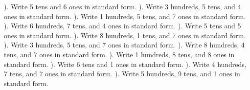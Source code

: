 \documentclass{article}%
\begin{document}
\newline%
\newline%
). Write 5 tens and 6 ones in standard form.%
\newline%
\newline%
). Write 3 hundreds, 5 tens, and 4 ones in standard form.%
\newline%
\newline%
). Write 1 hundreds, 5 tens, and 7 ones in standard form.%
\newline%
\newline%
). Write 6 hundreds, 7 tens, and 4 ones in standard form.%
\newline%
\newline%
). Write 5 tens and 5 ones in standard form.%
\newline%
\newline%
). Write 8 hundreds, 1 tens, and 7 ones in standard form.%
\newline%
\newline%
). Write 3 hundreds, 5 tens, and 7 ones in standard form.%
\newline%
\newline%
). Write 8 hundreds, 4 tens, and 7 ones in standard form.%
\newline%
\newline%
). Write 1 hundreds, 8 tens, and 8 ones in standard form.%
\newline%
\newline%
). Write 6 tens and 1 ones in standard form.%
\newline%
\newline%
). Write 4 hundreds, 7 tens, and 7 ones in standard form.%
\newline%
\newline%
). Write 5 hundreds, 9 tens, and 1 ones in standard form.%
\newline%
\newline%
\newline%
\end{document}

